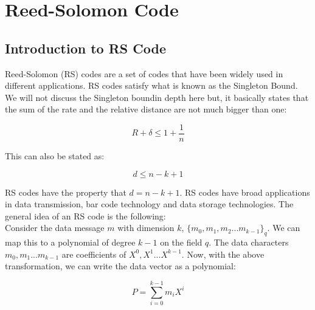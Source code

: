 \documentclass{article}
\begin{document}
\section{Reed-Solomon Code}
\subsection{Introduction to RS Code} 
Reed-Solomon (RS) codes are a set of codes that have been widely used in different applications. RS codes satisfy what is known as the Singleton Bound. We will not discuss the Singleton boundin depth here but, it basically states that the sum of the rate and the relative distance are not much bigger than one:

\begin{equation}
R + \delta \leq 1 + \frac{1}{n}
\end{equation}

\noindent This can also be stated as:

\begin{equation}
d \le n-k+1
\end{equation}

\noindent RS codes have the property that $d = n-k+1$.  RS codes have broad applications in data transmission, bar code technology and data storage technologies. The general idea of an RS code is the following:\\

Consider the data message $m$ with dimension $k$, $\{m_0, m_1,m_2...m_{k-1}\}_q$. We can map this to a polynomial of degree $k-1$ on the field $q$. The data characters $m_0, m_1 ...m_{k-1}$ are coefficients of $X^0, X^1...X^{k-1}$. Now, with the above transformation, we can write the data vector as a polynomial:

\begin{equation}
 P = \sum_{i=0}^{k-1}m_iX^i
\end{equation}
\end{document}
